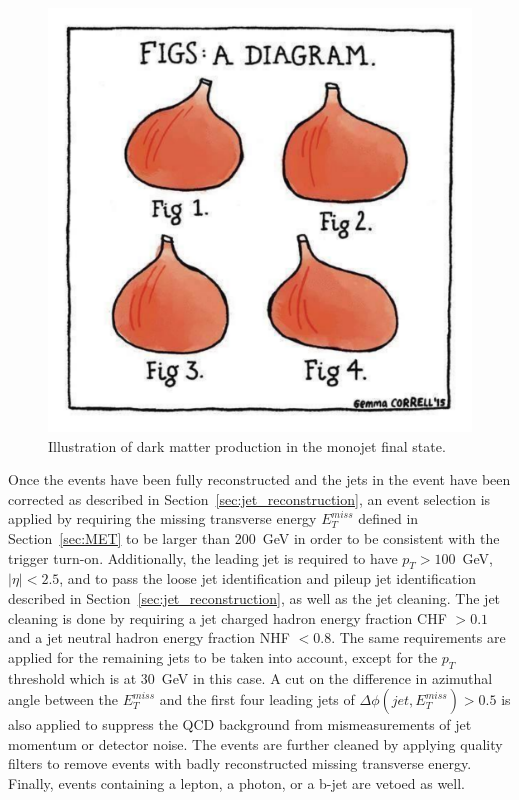 \begin{figure}[ht]
  \centering
 \includegraphics[width=.4\textwidth]{fig.pdf} 
 \caption{Illustration of dark matter production in the monojet final state.}
 \label{fig:monojet_display}
\end{figure}

Once the events have been fully reconstructed and the jets in the event have been corrected as described in Section~\ref{sec:jet_reconstruction}, an event selection is applied by requiring the missing transverse energy $E_T^{miss}$ defined in Section~\ref{sec:MET} to be larger than 200~GeV in order to be consistent with the trigger turn-on. Additionally, the leading jet is required to have $p_T > 100$~GeV, $|\eta| < 2.5$, and to pass the loose jet identification and pileup jet identification described in Section~\ref{sec:jet_reconstruction}, as well as the jet cleaning.  The jet cleaning is done by requiring a jet charged hadron energy fraction CHF $> 0.1$ and a jet neutral hadron energy fraction NHF $< 0.8$. The same requirements are applied for the remaining jets to be taken into account, except for the $p_T$ threshold which is at 30~GeV in this case. A cut on the difference in azimuthal angle between the $E_T^{miss}$ and the first four leading jets of $\Delta\phi(jet, E_T^{miss}) > 0.5$ is also applied to suppress the QCD background from mismeasurements of jet momentum or detector noise. The events are further cleaned by applying quality filters to remove events with badly reconstructed missing transverse energy. Finally, events containing a lepton, a photon, or a b-jet are vetoed as well.


